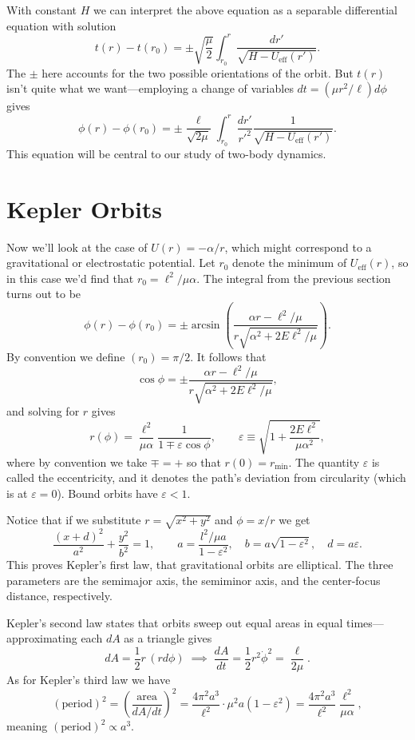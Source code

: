 \documentclass[../p111main.tex]{subfiles}
\begin{document}
With constant $H$ we can interpret the above equation as a separable differential equation with solution
\[ t(r) - t(r_0) = \pm \sqrt{\frac{\mu}{2}} \int_{r_0}^{r} \frac{dr'}{\sqrt{H - U_\textrm{eff}(r')}}. \]
The $\pm$ here accounts for the two possible orientations of the orbit.
But $t(r)$ isn't quite what we want---employing a change of variables $dt = (\mu r^2 / \ell) d\phi$ gives
\[ \phi(r) - \phi(r_0) = \pm \frac{\ell}{\sqrt{2\mu}} \int_{r_0}^{r} \frac{dr'}{r'^2} \frac{1}{\sqrt{H - U_\textrm{eff}(r')}}. \]
This equation will be central to our study of two-body dynamics.

\section{Kepler Orbits}
Now we'll look at the case of $U(r) = -\alpha / r$, which might correspond to a gravitational or electrostatic potential.
Let $r_0$ denote the minimum of $U_\textrm{eff}(r)$, so in this case we'd find that $r_0 = \ell^2 / \mu \alpha$.
The integral from the previous section turns out to be
\[ \phi(r) - \phi(r_0) = \pm \arcsin \left( \frac{\alpha r - \ell^2 / \mu}{r \sqrt{\alpha^2 + 2E \ell^2 / \mu}} \right). \]
By convention we define $(r_0) = \pi / 2$.
It follows that
\[ \cos \phi = \pm \frac{\alpha r - \ell^2 / \mu}{r \sqrt{\alpha^2 + 2 E \ell^2 / \mu}}, \]
and solving for $r$ gives
\[ r(\phi) = \frac{\ell^2}{\mu \alpha} \frac{1}{1 \mp \varepsilon \cos \phi}, \qquad \varepsilon \equiv \sqrt{1 + \frac{2E\ell^2}{\mu \alpha^2}}, \]
where by convention we take $\mp = +$ so that $r(0) = r_\textrm{min}$.
The quantity $\varepsilon$ is called the eccentricity, and it denotes the path's deviation from circularity (which is at $\varepsilon = 0$).
Bound orbits have $\varepsilon < 1$.

Notice that if we substitute $r = \sqrt{x^2 + y^2}$ and $ \phi = x / r$ we get
\[ \frac{(x+d)^2}{a^2} + \frac{y^2}{b^2} = 1, \qquad a = \frac{l^2 / \mu a}{1 - \varepsilon^2}, \quad b = a \sqrt{1 - \varepsilon^2}, \quad d = a\varepsilon. \]
This proves Kepler's first law, that gravitational orbits are elliptical.
The three parameters are the semimajor axis, the semiminor axis, and the center-focus distance, respectively.

Kepler's second law states that orbits sweep out equal areas in equal times---approximating each $dA$ as a triangle gives
\[ dA = \frac{1}{2} r \, (r d\phi) \;\implies\; \frac{dA}{dt} = \frac{1}{2} r^2 \dot \phi^2 = \frac{\ell}{2\mu}. \]
As for Kepler's third law we have
\[ (\textrm{period})^2 = \left( \frac{\textrm{area}}{dA / dt} \right)^2 = \frac{4\pi^2 a^3}{\ell^2} \cdot \mu^2 a(1 - \varepsilon^2) = \frac{4\pi^2 a^3}{\ell^2} \frac{\ell^2}{\mu \alpha}, \]
meaning $(\textrm{period})^2 \propto a^3$.
\end{document}
